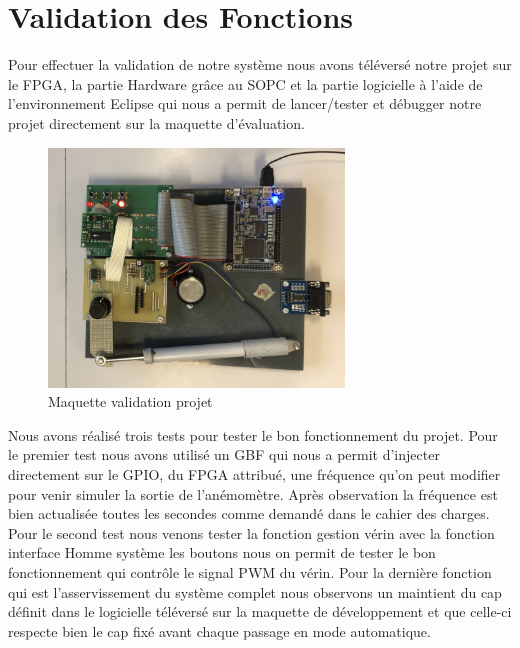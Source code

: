 \section{Validation des Fonctions}
Pour effectuer la validation de notre système nous avons téléversé notre projet sur le FPGA, la partie Hardware grâce au SOPC et la partie logicielle à l'aide de l'environnement Eclipse qui nous a permit de lancer/tester et débugger notre projet directement sur la maquette d'évaluation.

\begin{figure}[h]
    \begin{center}
      \includegraphics[width=0.7\textwidth]{images/maquette.jpg}
      \caption{Maquette validation projet}
    \end{center}
  \end{figure}

  Nous avons réalisé trois tests pour tester le bon fonctionnement du projet. Pour le premier test nous avons utilisé un GBF qui nous a permit d'injecter directement sur le GPIO, du FPGA attribué, une fréquence qu'on peut modifier pour venir simuler la sortie de l'anémomètre. Après observation la fréquence est bien actualisée toutes les secondes comme demandé dans le cahier des charges. Pour le second test nous venons tester la fonction gestion vérin avec la fonction interface Homme système les boutons nous on permit de tester le bon fonctionnement qui contrôle le signal PWM du vérin. Pour la dernière fonction qui est l'asservissement du système complet nous observons un maintient du cap définit dans le logicielle téléversé sur la maquette de développement et que celle-ci respecte bien le cap fixé avant chaque passage en mode automatique.